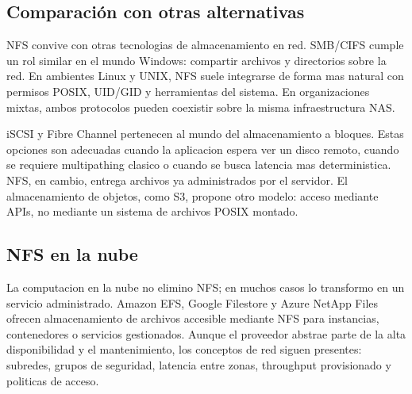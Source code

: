 \subsection{Comparación con otras alternativas}

NFS convive con otras tecnologias de almacenamiento en red. SMB/CIFS cumple un rol similar en el mundo Windows: compartir archivos y directorios sobre la red. En ambientes Linux y UNIX, NFS suele integrarse de forma mas natural con permisos POSIX, UID/GID y herramientas del sistema. En organizaciones mixtas, ambos protocolos pueden coexistir sobre la misma infraestructura NAS.

iSCSI y Fibre Channel pertenecen al mundo del almacenamiento a bloques. Estas opciones son adecuadas cuando la aplicacion espera ver un disco remoto, cuando se requiere multipathing clasico o cuando se busca latencia mas deterministica. NFS, en cambio, entrega archivos ya administrados por el servidor. El almacenamiento de objetos, como S3, propone otro modelo: acceso mediante APIs, no mediante un sistema de archivos POSIX montado.

\subsection{NFS en la nube}

La computacion en la nube no elimino NFS; en muchos casos lo transformo en un servicio administrado. Amazon EFS, Google Filestore y Azure NetApp Files ofrecen almacenamiento de archivos accesible mediante NFS para instancias, contenedores o servicios gestionados. Aunque el proveedor abstrae parte de la alta disponibilidad y el mantenimiento, los conceptos de red siguen presentes: subredes, grupos de seguridad, latencia entre zonas, throughput provisionado y politicas de acceso.
